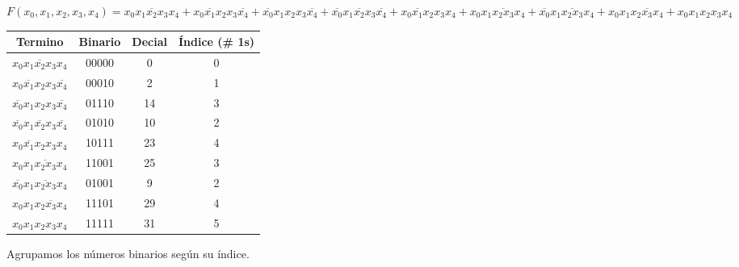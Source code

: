 \documentclass[a4paper,12pt]{article}
\begin{document}
\begin{enumerate}[label=\textcolor{teal}{\textbf{\arabic*.}}]
        \begin{center}
            $F(x_0,x_1,x_2,x_3,x_4) = 
            \overline{x_0 x_1 x_2 x_3 x_4} 
            + \overline{x_0 x_1 x_2} x_3 \overline{x_4} 
            + \overline{x_0} x_1 x_2 x_3 \overline{x_4}   
            + \overline{x_0} x_1 \overline{x_2} x_3 \overline{x_4}  
            + x_0 \overline{x_1} x_2 x_3 x_4    
            + x_0 x_1 \overline{ x_2 x_3} x_4 
            + \overline{x_0} x_1 \overline{ x_2 x_3} x_4 
            + x_0 x_1 x_2 \overline{ x_3} x_4
            + x_0 x_1 x_2 x_3 x_4
            $
        \end{center}
        
            \begin{table}[H]
            \centering
            \begin{tabular}{|c|c|c|c|}
                \hline
                Termino & Binario & Decial & Índice (\# 1s)\\ 
                \hline
                $\overline{x_0 x_1 x_2 x_3 x_4}$  & 00000 & 0 & 0 \\ 
                \hline 
                $\overline{x_0 x_1 x_2} x_3 \overline{x_4} $ & 00010 & 2 & 1 \\ 
                \hline 
                $\overline{x_0} x_1 x_2 x_3 \overline{x_4} $ & 01110 & 14 & 3 \\ 
                \hline 
                $ \overline{x_0} x_1 \overline{x_2} x_3 \overline{x_4}$ & 01010 & 10 & 2 \\ 
                \hline 
                $x_0 \overline{x_1} x_2 x_3 x_4$ & 10111 & 23 & 4 \\ 
                \hline 
                $x_0 x_1 \overline{ x_2 x_3} x_4 $ & 11001 & 25 & 3 \\ 
                \hline 
                $ \overline{x_0} x_1 \overline{ x_2 x_3} x_4 $ & 01001 & 9 & 2 \\
                \hline 
                $x_0 x_1 x_2 \overline{ x_3} x_4 $ & 11101 & 29 & 4 \\ 
                \hline
                $x_0 x_1 x_2 x_3 x_4 $ & 11111 & 31 & 5 \\ 
                \hline  
            \end{tabular}
        \end{table}

        Agrupamos los números binarios según su índice.\\


\end{enumerate}
\end{document}
